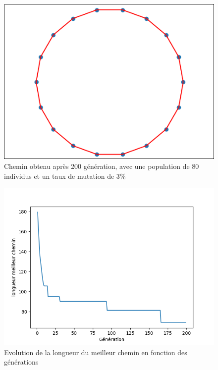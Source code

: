 \documentclass[11pt]{article}
\begin{document}
\begin{figure}[htb]
\centering
\includegraphics[width=.9\linewidth]{./gen200.png}
\caption{Chemin obtenu après 200 génération, avec une population de 80 individus et un taux de mutation de 3\%}
\end{figure}

\begin{figure}[htb]
\centering
\includegraphics[width=.9\linewidth]{./evol.png}
\caption{Evolution de la longueur du meilleur chemin en fonction des générations}
\end{figure}
\end{document}
